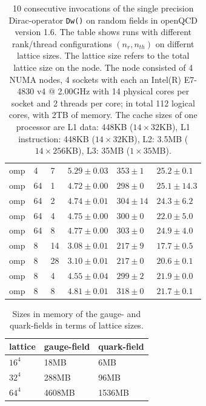 \documentclass{article}
\theoremstyle{plain} %
\theoremstyle{convention} %
\theoremstyle{remark} %
\def\code#1{\texttt{#1}}
\numberwithin{equation}{section}
\begin{document}
\begin{table}
\begin{tabular}{ |p{1.5cm}||p{1cm}|p{1cm}|p{2cm}|p{2cm}|p{2cm}| }
        omp & 4 & 7 & $5.29 \pm 0.03$ & $353 \pm 1$ & $25.2 \pm 0.1$ \\
        omp & 64 & 1 & $4.72 \pm 0.00$ & $298 \pm 0$ & $25.1 \pm 14.3$ \\
        omp & 64 & 2 & $4.74 \pm 0.01$ & $304 \pm 14$ & $24.3 \pm 6.2$ \\
        omp & 64 & 4 & $4.75 \pm 0.00$ & $300 \pm 0$ & $22.0 \pm 5.0$ \\
        omp & 64 & 8 & $4.77 \pm 0.00$ & $303 \pm 0$ & $24.9 \pm 4.0$ \\
        omp & 8 & 14 & $3.08 \pm 0.01$ & $217 \pm 9$ & $17.7 \pm 0.5$ \\
        omp & 8 & 28 & $3.10 \pm 0.01$ & $217 \pm 0$ & $20.6 \pm 0.1$ \\
        omp & 8 & 4 & $4.55 \pm 0.04$ & $299 \pm 2$ & $21.9 \pm 0.0$ \\
        omp & 8 & 8 & $4.81 \pm 0.01$ & $318 \pm 0$ & $21.7 \pm 0.1$ \\
        \hline
    \end{tabular}
    \caption{\num{10} consecutive invocations of the single precision Dirac-operator \code{Dw()} on random fields in openQCD version 1.6. The table shows runs with different rank/thread configurations $(n_r, n_{th})$ on differnt lattice sizes. The lattice size refers to the total lattice size on the node. The node consisted of \num{4} NUMA nodes, \num{4} sockets with each an Intel(R) E7-4830 v4 @ 2.00GHz with \num{14} physical cores per socket and \num{2} threads per core; in total \num{112} logical cores, with 2TB of memory. The cache sizes of one processor are L1 data: 448KB ($14 \times 32$KB), L1 instruction: 448KB ($14 \times 32$KB), L2: 3.5MB ($14 \times 256$KB), L3: 35MB ($1 \times 35$MB).}
    \label{tab:dop_omp_intel}
\end{table}

\begin{table}
\centering
    \begin{tabular}{ |p{1cm}|p{2cm}|p{2cm}| }
        \hline
        lattice & gauge-field & quark-field \\
        \hline
        $16^4$ & 18MB & 6MB \\
        $32^4$ & 288MB & 96MB \\
        $64^4$ & 4608MB & 1536MB \\
        \hline
    \end{tabular}
    \caption{Sizes in memory of the gauge- and quark-fields in terms of lattice sizes.}
    \label{tab:lattice_sizes}
\end{table}
\end{document}
